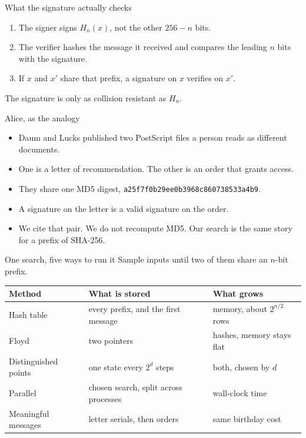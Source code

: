 \documentclass[aspectratio=169,11pt]{beamer}
\newcommand{\Hn}{H_{n}}
\begin{document}
\begin{frame}{What the signature actually checks}
  \begin{enumerate}
    \item The signer signs \(\Hn(x)\), not the other \(256 - n\) bits.
    \item The verifier hashes the message it received and compares the leading \(n\) bits with the signature.
    \item If \(x\) and \(x'\) share that prefix, a signature on \(x\) verifies on \(x'\).
  \end{enumerate}
  \vspace{0.6em}
  The signature is only as collision resistant as \(\Hn\).
\end{frame}

\begin{frame}{Alice, as the analogy}
  \begin{itemize}
    \item Daum and Lucks published two PostScript files a person reads as different documents.
    \item One is a letter of recommendation. The other is an order that grants access.
    \item They share one MD5 digest, \texttt{a25f7f0b29ee0b3968c860738533a4b9}.
    \item A signature on the letter is a valid signature on the order.
    \item We cite that pair. We do not recompute MD5. Our search is the same story for a prefix of SHA-256.
  \end{itemize}
\end{frame}

\begin{frame}{One search, five ways to run it}
  Sample inputs until two of them share an \(n\)-bit prefix.
  \begin{center}
  \begin{tabular}{@{}lll@{}}
    \toprule
    Method & What is stored & What grows \\
    \midrule
    Hash table & every prefix, and the first message & memory, about \(2^{n/2}\) rows \\
    Floyd & two pointers & hashes, memory stays flat \\
    Distinguished points & one state every \(2^{d}\) steps & both, chosen by \(d\) \\
    Parallel & chosen search, split across processes & wall-clock time \\
    Meaningful messages & letter serials, then orders & same birthday cost \\
    \bottomrule
  \end{tabular}
  \end{center}
\end{frame}
\end{document}
